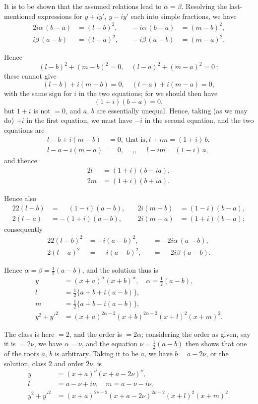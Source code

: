 \documentclass[11pt,a4paper]{article}
\theoremstyle{plain}
\theoremstyle{definition}
\begin{document}
It is to be shown that the assumed relations lead to $\alpha = \beta$. Resolving the last-mentioned expressions for $y+iy'$, $y-iy'$ each into simple fractions, we have
\begin{alignat*}{2}
i\alpha\, (b-a) &= (l-b)^2, &\quad -i\alpha\, (b-a) &= (m-b)^2, \\
i\beta\, (a-b) &= (l-a)^2, &\quad -i\beta\, (a-b) &= (m-a)^2.
\end{alignat*}

Hence
\[ (l-b)^2 + (m-b)^2 = 0,\quad (l-a)^2 + (m-a)^2 = 0\,; \]
these cannot give
\[ (l-b) + i(m-b) = 0,\quad (l-a) + i(m-a) = 0, \]
with the same sign for $i$ in the two equations; for we should then have
\[ (1+i)(b-a) = 0, \]
but $1+i$ is not $=0$, and $a$, $b$ are essentially unequal. Hence, taking (as we may do) $+i$ in the first equation, we must have $-i$ in the second equation, and the two equations are
\begin{align*}
l - b + i(m-b) &= 0,\ \text{that is,}\ l + im = (1+i)\, b, \\
l - a - i(m-a) &= 0,\ \quad \text{,,}\ \quad\ l - im = (1-i)\, a,
\end{align*}
and thence
\begin{align*}
2l\, &= (1+i)(b - ia), \\
2m &= (1+i)(b + ia).
\end{align*}

Hence also
\begin{alignat*}{2}
2(l-b) &= \phantom{-}(1-i)(a-b), &\quad 2i(m-b) &= (1-i)(b-a), \\
2(l-a) &= -(1+i)(a-b), &\quad 2i(m-a) &= (1+i)(b-a);
\end{alignat*}
consequently
\begin{alignat*}{2}
2(l-b)^2 &= -i(a-b)^2, &&= -2i\alpha\, (a-b), \\
2(l-a)^2 &= \phantom{-}i(a-b)^2, &&= \phantom{-}2i\beta\, (a-b).
\end{alignat*}

Hence $\alpha = \beta = \tfrac12(a-b)$, and the solution thus is
\begin{align*}
y &= (x+a)^{\alpha} (x+b)^{\alpha},\quad \alpha = \tfrac12(a-b), \\
l &= \tfrac12\{a+b+i(a-b)\}, \\
m &= \tfrac12\{a+b-i(a-b)\}, \\
y^2 + y'^2 &= (x+a)^{2\alpha-2} (x+b)^{2\alpha-2} (x+l)^2 (x+m)^2.
\end{align*}

The class is here $=2$, and the order is $=2\alpha$; considering the order as given, say it is $=2\nu$, we have $\alpha = \nu$, and the equation $\nu = \tfrac12(a-b)$ then shows that one of the roots $a$, $b$ is arbitrary. Taking it to be $a$, we have $b = a - 2\nu$, or the solution, class 2 and order $2\nu$, is
\begin{align*}
y &= (x+a)^{\nu} (x+a-2\nu)^{\nu}, \\
l &= a - \nu + i\nu,\quad m = a - \nu - i\nu, \\
y^2 + y'^2 &= (x+a)^{2\nu-2} (x+a-2\nu)^{2\nu-2} (x+l)^2 (x+m)^2.
\end{align*}
\end{document}
